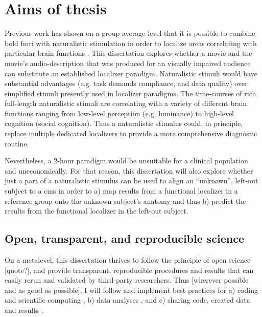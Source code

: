 \section{Aims of thesis}


%
Previous work has shown on a group average level that it is possible to combine
\ac{bold} \ac{fmri} with naturalistic stimulation in order to localize areas
correlating with particular brain functions \citep{bartels2004mapping}.
%
This dissertation explores whether a movie and the movie's audio-description
that was produced for an visually impaired audience can substitute an
established localizer paradigm.
%
Naturalistic stimuli would have substantial advantages (e.g. task demands
compliance, and data quality) over simplified stimuli presently used in
localizer paradigms.
%
The time-courses of rich, full-length naturalistic stimuli are correlating with
a variety of different brain functions ranging from low-level perception (e.g.
luminance) to high-level cognition (social cognition).
%
Thus a naturalistic stimulus could, in principle, replace multiple dedicated
localizers to provide a more comprehensive diagnostic routine.

%
Nevertheless, a 2-hour paradigm would be unsuitable for a clinical population
and uneconomically.
%
For that reason, this dissertation will also explore whether just a part of a
naturalistic stimulus can be used to align an ``unknown'', left-out subject to a
\ac{cms} in order to a) map results from a functional localizer in a reference
group onto the unknown subject's anatomy and thus b) predict the results from
the functional localizer in the left-out subject.
%

\subsection{Open, transparent, and reproducible science}
%
%
%
%
On a metalevel, this dissertation thrives to follow the principle of open
science [quote?], and provide transparent, reproducible procedures and results
\citep{poldrack2017scanning} that can easily rerun and validated by third-party
researchers.
Thus [wherever possible and as good as possible], I will follow and implement
best practices for a) coding and scientific computing \citep{wilson2014best}, b)
data analyses \citep{nichols2017best}, and c) sharing code, created data and
results \citep{eglen2017toward, nichols2017best}.


